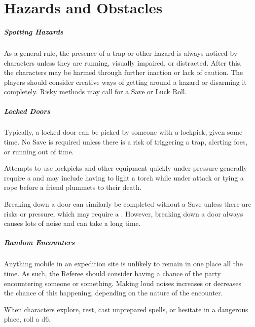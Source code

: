 \documentclass[itdr]{subfiles}
\begin{document}
\chapter{Hazards and Obstacles}
\label{ch:hazards_and_obstacles}

\paragraph{Spotting Hazards}
As a general rule, the presence of a trap or other hazard is always noticed by characters unless they are running, visually impaired, or distracted. After this, the characters may be harmed through further inaction or lack of caution. The players should consider creative ways of getting around a hazard or disarming it completely. Risky methods may call for a Save or Luck Roll.

\vfill
\paragraph{Locked Doors}
Typically, a locked door can be picked by someone with a lockpick, given some time. No Save is required unless there is a risk of triggering a trap, alerting foes, or running out of time.

Attempts to use lockpicks and other equipment quickly under pressure generally require a  and may include having to light a torch while under attack or tying a rope before a friend plummets to their death.

Breaking down a door can similarly be completed without a Save unless there are risks or pressure, which may require a . However, breaking down a door always causes lots of noise and can take a long time.

\vfill
\paragraph{Random Encounters}
Anything mobile in an expedition site is unlikely to remain in one place all the time. As such, the Referee should consider having a chance of the party encountering someone or something. Making loud noises increases or decreases the chance of this happening, depending on the nature of the encounter.

When characters explore, rest, cast unprepared spells, or hesitate in a dangerous place, roll a d6.
\end{document}
